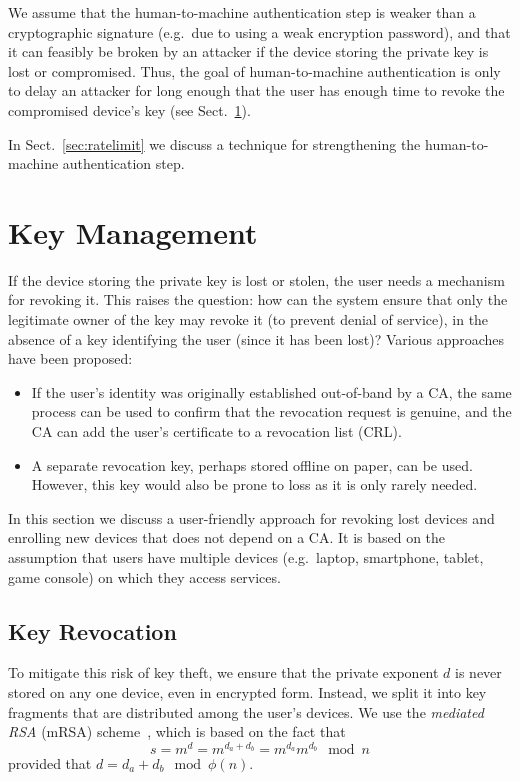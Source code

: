 \documentclass{llncs}
\begin{document}
We assume that the human-to-machine authentication step is weaker than a cryptographic signature
(e.g.\ due to using a weak encryption password), and that it can feasibly be broken by an attacker
if the device storing the private key is lost or compromised. Thus, the goal of human-to-machine
authentication is only to delay an attacker for long enough that the user has enough time to revoke
the compromised device's key (see Sect.~\ref{sec:management}).

In Sect.~\ref{sec:ratelimit} we discuss a technique for strengthening the human-to-machine
authentication step.

\section{Key Management}\label{sec:management}

If the device storing the private key is lost or stolen, the user needs a mechanism for revoking it.
This raises the question: how can the system ensure that only the legitimate owner of the key may
revoke it (to prevent denial of service), in the absence of a key identifying the user (since it has
been lost)? Various approaches have been proposed:

\begin{itemize}
\item If the user's identity was originally established out-of-band by a CA, the same process can be
used to confirm that the revocation request is genuine, and the CA can add the user's certificate to
a revocation list (CRL).
\item A separate revocation key, perhaps stored offline on paper, can be used. However, this key
would also be prone to loss as it is only rarely needed.
\end{itemize}

In this section we discuss a user-friendly approach for revoking lost devices and enrolling new
devices that does not depend on a CA. It is based on the assumption that users have multiple devices
(e.g.\ laptop, smartphone, tablet, game console) on which they access services.

\subsection{Key Revocation}\label{sec:revocation}

To mitigate this risk of key theft, we ensure that the private exponent $d$ is never stored on any
one device, even in encrypted form. Instead, we split it into key fragments that are distributed
among the user's devices. We use the \emph{mediated RSA} (mRSA) scheme~\cite{Boneh01,Kutyiowski12},
which is based on the fact that
\begin{equation}
s = m^d = m^{d_a + d_b} = m^{d_a} m^{d_b} \mod n
\end{equation}
provided that $d = d_a + d_b \mod \phi(n)$.
\end{document}
